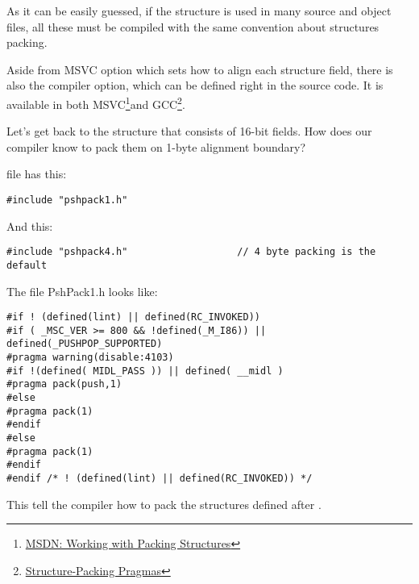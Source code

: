 As it can be easily guessed, if the structure is used in many source and object files,
all these must be compiled with the same convention about structures packing.

\newcommand{\FNURLMSDNZP}{\footnote{\href{http://go.yurichev.com/17067}
{MSDN: Working with Packing Structures}}}
\newcommand{\FNURLGCCPC}{\footnote{\href{http://go.yurichev.com/17068}
{Structure-Packing Pragmas}}}

Aside from MSVC  option which sets how to align each structure field, there is also
the  compiler option, which can be defined right in the source code.
It is available in both MSVC\FNURLMSDNZP and GCC\FNURLGCCPC{}.

Let's get back to the  structure that consists of 16-bit fields.
How does our compiler know to pack them on 1-byte alignment boundary?

 file has this:

\begin{lstlisting}[caption=WinNT.h]
#include "pshpack1.h"
\end{lstlisting}

And this:

\begin{lstlisting}[caption=WinNT.h]
#include "pshpack4.h"                   // 4 byte packing is the default
\end{lstlisting}

The file PshPack1.h looks like:

\begin{lstlisting}[caption=PshPack1.h]
#if ! (defined(lint) || defined(RC_INVOKED))
#if ( _MSC_VER >= 800 && !defined(_M_I86)) || defined(_PUSHPOP_SUPPORTED)
#pragma warning(disable:4103)
#if !(defined( MIDL_PASS )) || defined( __midl )
#pragma pack(push,1)
#else
#pragma pack(1)
#endif
#else
#pragma pack(1)
#endif
#endif /* ! (defined(lint) || defined(RC_INVOKED)) */
\end{lstlisting}

This tell the compiler how to pack the structures defined after .


